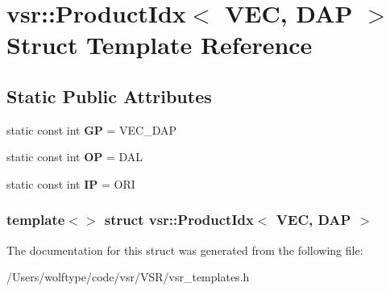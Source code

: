 \hypertarget{structvsr_1_1_product_idx_3_01_v_e_c_00_01_d_a_p_01_4}{\section{vsr\-:\-:Product\-Idx$<$ V\-E\-C, D\-A\-P $>$ Struct Template Reference}
\label{structvsr_1_1_product_idx_3_01_v_e_c_00_01_d_a_p_01_4}
}
\subsection*{Static Public Attributes}
\begin{DoxyCompactItemize}
\item 
\hypertarget{structvsr_1_1_product_idx_3_01_v_e_c_00_01_d_a_p_01_4_a392f045cb33dd62b6900abfe561043cb}{static const int {\bfseries G\-P} = V\-E\-C\-\_\-\-D\-A\-P}\label{structvsr_1_1_product_idx_3_01_v_e_c_00_01_d_a_p_01_4_a392f045cb33dd62b6900abfe561043cb}

\item 
\hypertarget{structvsr_1_1_product_idx_3_01_v_e_c_00_01_d_a_p_01_4_abbc840d7d08c484ff9c58dda29ac86df}{static const int {\bfseries O\-P} = D\-A\-L}\label{structvsr_1_1_product_idx_3_01_v_e_c_00_01_d_a_p_01_4_abbc840d7d08c484ff9c58dda29ac86df}

\item 
\hypertarget{structvsr_1_1_product_idx_3_01_v_e_c_00_01_d_a_p_01_4_a58773fa0c84b6d8c4178ed9e7df15c2a}{static const int {\bfseries I\-P} = O\-R\-I}\label{structvsr_1_1_product_idx_3_01_v_e_c_00_01_d_a_p_01_4_a58773fa0c84b6d8c4178ed9e7df15c2a}

\end{DoxyCompactItemize}
\subsubsection*{template$<$$>$ struct vsr\-::\-Product\-Idx$<$ V\-E\-C, D\-A\-P $>$}



The documentation for this struct was generated from the following file\-:\begin{DoxyCompactItemize}
\item 
/\-Users/wolftype/code/vsr/\-V\-S\-R/vsr\-\_\-templates.\-h\end{DoxyCompactItemize}
